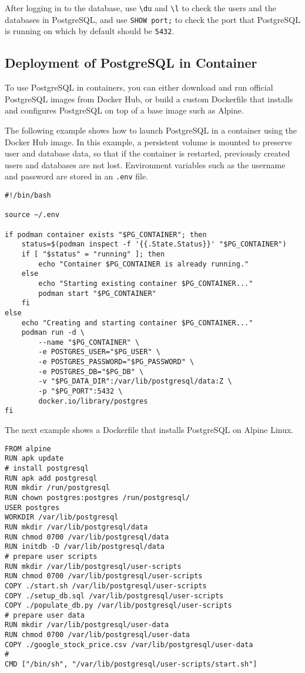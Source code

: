 After logging in to the database, use \verb|\du| and \verb|\l| to check the users and the databases in PostgreSQL, and use \verb|SHOW port;| to check the port that PostgreSQL is running on which by default should be \verb|5432|.

\subsection{Deployment of PostgreSQL in Container}

To use PostgreSQL in containers, you can either download and run official PostgreSQL images from Docker Hub, or build a custom Dockerfile that installs and configures PostgreSQL on top of a base image such as Alpine. 

The following example shows how to launch PostgreSQL in a container using the Docker Hub image. In this example, a persistent volume is mounted to preserve user and database data, so that if the container is restarted, previously created users and databases are not lost. Environment variables such as the username and password are stored in an \verb|.env| file.

\begin{lstlisting}
#!/bin/bash

source ~/.env

if podman container exists "$PG_CONTAINER"; then
    status=$(podman inspect -f '{{.State.Status}}' "$PG_CONTAINER")
    if [ "$status" = "running" ]; then
        echo "Container $PG_CONTAINER is already running."
    else
        echo "Starting existing container $PG_CONTAINER..."
        podman start "$PG_CONTAINER"
    fi
else
    echo "Creating and starting container $PG_CONTAINER..."
    podman run -d \
        --name "$PG_CONTAINER" \
        -e POSTGRES_USER="$PG_USER" \
        -e POSTGRES_PASSWORD="$PG_PASSWORD" \
        -e POSTGRES_DB="$PG_DB" \
        -v "$PG_DATA_DIR":/var/lib/postgresql/data:Z \
        -p "$PG_PORT":5432 \
        docker.io/library/postgres
fi
\end{lstlisting}

The next example shows a Dockerfile that installs PostgreSQL on Alpine Linux.

\begin{lstlisting}
FROM alpine
RUN apk update
# install postgresql
RUN apk add postgresql
RUN mkdir /run/postgresql
RUN chown postgres:postgres /run/postgresql/
USER postgres
WORKDIR /var/lib/postgresql
RUN mkdir /var/lib/postgresql/data
RUN chmod 0700 /var/lib/postgresql/data
RUN initdb -D /var/lib/postgresql/data
# prepare user scripts
RUN mkdir /var/lib/postgresql/user-scripts
RUN chmod 0700 /var/lib/postgresql/user-scripts
COPY ./start.sh /var/lib/postgresql/user-scripts
COPY ./setup_db.sql /var/lib/postgresql/user-scripts
COPY ./populate_db.py /var/lib/postgresql/user-scripts
# prepare user data
RUN mkdir /var/lib/postgresql/user-data
RUN chmod 0700 /var/lib/postgresql/user-data
COPY ./google_stock_price.csv /var/lib/postgresql/user-data
#
CMD ["/bin/sh", "/var/lib/postgresql/user-scripts/start.sh"]
\end{lstlisting}

